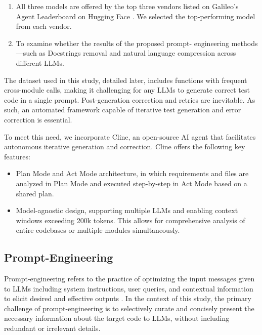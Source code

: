 \begin{enumerate}
    \item All three models are offered by the top three vendors listed on Galileo's Agent Leaderboard on Hugging Face \cite{agent_leaderboard}. We selected the top-performing model from each vendor.
\vspace{0.2cm}
    \item To examine whether the results of the proposed prompt- engineering methods—such as Docstrings removal and natural language compression across different LLMs.
\end{enumerate}

The dataset used in this study, detailed later, includes functions with frequent cross-module calls, making it challenging for any LLMs to generate correct test code in a single prompt. Post-generation correction and retries are inevitable. As such, an automated framework capable of iterative test generation and error correction is essential.

To meet this need, we incorporate Cline, an open-source AI agent that facilitates autonomous iterative generation and correction. Cline offers the following key features:

\begin{itemize}[label={$\bullet$}]
    \item Plan Mode and Act Mode architecture, in which requirements and files are analyzed in Plan Mode and executed step-by-step in Act Mode based on a shared plan.
\vspace{0.2cm}
    \item Model-agnostic design, supporting multiple LLMs and enabling context windows exceeding 200k tokens. This allows for comprehensive analysis of entire codebases or multiple modules simultaneously.
\end{itemize}


\subsection{Prompt-Engineering}
Prompt-engineering refers to the practice of optimizing the input messages given to LLMs including system instructions, user queries, and contextual information to elicit desired and effective outputs \cite{llmlingua}. In the context of this study, the primary challenge of prompt-engineering is to selectively curate and concisely present the necessary information about the target code to LLMs, without including redundant or irrelevant details.

